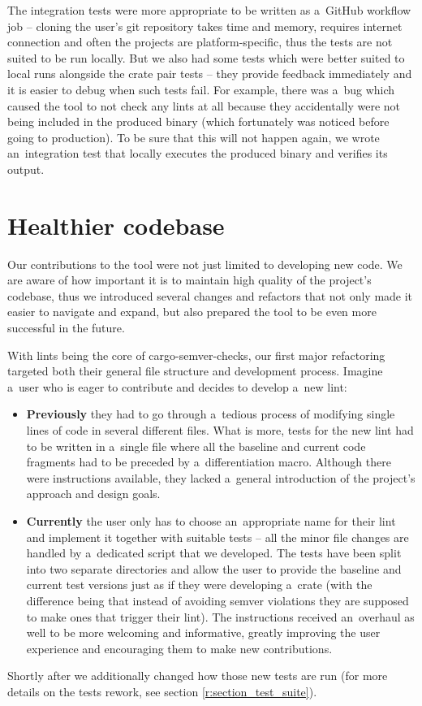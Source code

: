 \documentclass[licencjacka,en]{pracamgr}
\begin{document}
The integration tests were more appropriate to be written as a~GitHub workflow job
-- cloning the user's git repository takes time and memory, requires internet connection
and often the projects are platform-specific,
thus the tests are not suited to be run locally.
But we also had some tests which were better suited to local runs alongside the crate pair tests
-- they provide feedback immediately and it is easier to debug when such tests fail.
For example, there was a~bug which caused the tool to not check any lints at all
because they accidentally were not being included in the produced binary
(which fortunately was noticed before going to production).
To be sure that this will not happen again, we wrote an~integration test that
locally executes the produced binary and verifies its output.

\section{Healthier codebase}\label{r:section_healthier_codebase}

Our contributions to the tool were not just limited to developing new code. We are aware of
how important it is to maintain high quality of the project's codebase, thus we introduced
several changes and refactors that not only made it easier to navigate and expand, but also
prepared the tool to be even more successful in the future.

With lints being the core of cargo-semver-checks, our first major refactoring targeted both their
general file structure and development process. Imagine a~user who is eager to contribute
and decides to develop a~new lint:
\begin{itemize}
	\item \textbf{Previously} they had to go through a~tedious process of modifying single lines
	of code in several different files. What is more, tests for the new lint had to be written
	in a~single file where all the baseline and current code fragments had to be preceded by
	a~differentiation macro. Although there were instructions available, they lacked
	a~general introduction of the project's approach and design goals.

	\item \textbf{Currently} the user only has to choose an~appropriate name for their lint
	and implement it together with suitable tests -- all the minor file changes are handled
	by a~dedicated script that we developed. The tests have been split into two separate
	directories and allow the user to provide the baseline and current test versions just
	as if they were developing a~crate (with the difference being that instead of avoiding semver
	violations they are supposed to make ones that trigger their lint). The instructions received
	an~overhaul as well to be more welcoming and informative, greatly improving the user experience
	and encouraging them to make new contributions.
\end{itemize}
Shortly after we additionally changed how those new tests are run
(for more details on the tests rework, see section \ref{r:section_test_suite}).
\end{document}
